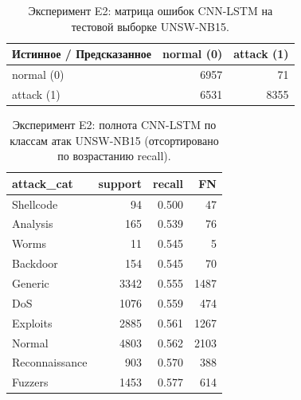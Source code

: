 \begin{table}[H]
\centering
\caption{Эксперимент E2: матрица ошибок CNN-LSTM на тестовой выборке UNSW-NB15.}
\label{tab:E2-confusion}
\renewcommand{\arraystretch}{1.2}
\begin{tabular}{lrr}
\toprule
\textbf{Истинное / Предсказанное} & \textbf{normal (0)} & \textbf{attack (1)} \\
\midrule
normal (0) & 6957 & 71 \\
attack (1) & 6531 & 8355 \\
\bottomrule
\end{tabular}
\end{table}

\begin{table}[H]
\centering
\caption{Эксперимент E2: полнота CNN-LSTM по классам атак UNSW-NB15 (отсортировано по возрастанию recall).}
\label{tab:E2-per-attack}
\renewcommand{\arraystretch}{1.15}
\begin{tabular}{lrrr}
\toprule
\textbf{attack\_cat} & \textbf{support} & \textbf{recall} & \textbf{FN} \\
\midrule
Shellcode & 94 & 0.500 & 47 \\
Analysis & 165 & 0.539 & 76 \\
Worms & 11 & 0.545 & 5 \\
Backdoor & 154 & 0.545 & 70 \\
Generic & 3342 & 0.555 & 1487 \\
DoS & 1076 & 0.559 & 474 \\
Exploits & 2885 & 0.561 & 1267 \\
Normal & 4803 & 0.562 & 2103 \\
Reconnaissance & 903 & 0.570 & 388 \\
Fuzzers & 1453 & 0.577 & 614 \\
\bottomrule
\end{tabular}
\end{table}